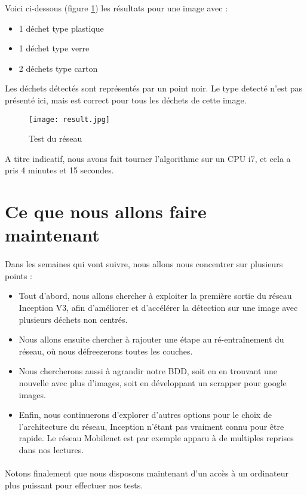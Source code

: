 \documentclass[12pt,a4paper,twocolumn]{article}
\begin{document}
Voici ci-dessous (figure \ref{result}) les résultats pour une image avec :
\begin{itemize}
  \item 1 déchet type plastique
  \item 1 déchet type verre
  \item 2 déchets type carton
\end{itemize}

Les déchets détectés sont représentés par un point noir. Le type detecté n'est pas présenté ici, mais est correct pour tous les déchets de cette image.

\begin{figure}[H]
	\center
	\texttt{[image: result.jpg]}
	\caption{Test du réseau}
	\label{result}
\end{figure}

A titre indicatif, nous avons fait tourner l’algorithme sur un CPU i7, et cela a pris 4 minutes et 15 secondes.

\section{Ce que nous allons faire maintenant}

\paragraph*{}

Dans les semaines qui vont suivre, nous allons nous concentrer sur plusieurs points :
\begin{itemize}
  \item Tout d’abord, nous allons chercher à exploiter la première sortie du réseau Inception V3, afin d’améliorer et d’accélérer la détection sur une image avec plusieurs déchets non centrés.
  \item Nous allons ensuite chercher à rajouter une étape au ré-entraînement du réseau, où nous défreezerons toutes les couches.
  \item Nous chercherons aussi à agrandir notre BDD, soit en en trouvant une nouvelle avec plus d'images, soit en développant un scrapper pour google images.
  \item Enfin, nous continuerons d'explorer d'autres options pour le choix de l'architecture du réseau, Inception n'étant pas vraiment connu pour être rapide. Le réseau Mobilenet est par exemple apparu à de multiples reprises dans nos lectures.
\end{itemize}

\paragraph*{}

Notons finalement que nous disposons maintenant d'un accès à un ordinateur plus puissant pour effectuer nos tests.
\end{document}
